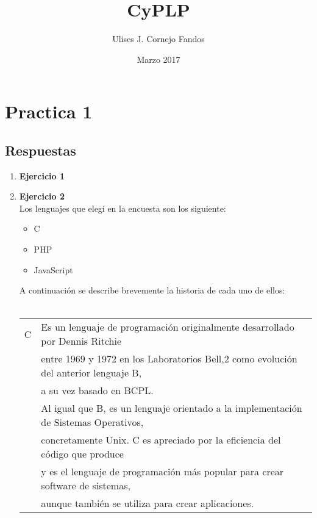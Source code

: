 \documentclass[a4paper,10pt]{article}
\title{CyPLP}
\author{Ulises J. Cornejo Fandos}
\date{Marzo 2017}
\begin{document}
\maketitle

\section{Practica 1}
\subsection{Respuestas}
    \begin{enumerate}
        \item \textbf{Ejercicio 1}
        \item \textbf{Ejercicio 2} \\
        Los lenguajes que elegí en la encuesta son los siguiente:
        \begin{itemize}
            \item C
            \item PHP
            \item JavaScript
        \end{itemize}
        A continuación se describe brevemente la historia de cada uno de ellos: \\ \\
        \begin{tabular}{r|l}
            \textsc{C} 
                & Es un lenguaje de programación originalmente desarrollado por Dennis Ritchie \\ 
                & entre 1969 y 1972 en los Laboratorios Bell,2 como evolución del anterior lenguaje B, \\
                & a su vez basado en BCPL. \\
                
                & Al igual que B, es un lenguaje orientado a la implementación de Sistemas Operativos, \\
                & concretamente Unix. C es apreciado por la eficiencia del código que produce \\ 
                & y es el lenguaje de programación más popular para crear software de sistemas,\\ 
                & aunque también se utiliza para crear aplicaciones. \\
        

\end{tabular}
\end{enumerate}
\end{document}
